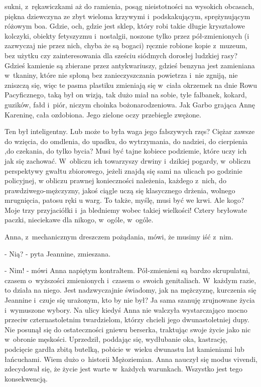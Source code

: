 \documentclass[oneside,polish,12pt,sfheadings]{mwbk}
\begin{document}
sukni, z~rękawiczkami aż do ramienia, posąg nieistotności na wysokich
obcasach, piękna dziewczyna ze zbyt wieloma krzywymi i~podskakującym,
sprężynującym różowym boa. Gdzie, och, gdzie jest sklep, który robi
takie długie kryształowe kolczyki, obiekty fetyszyzmu i~nostalgii,
noszone tylko przez pół-zmienionych (i zazwyczaj nie przez nich, chyba
że są bogaci) ręcznie robione kopie z~muzeum, bez użytku czy zainteresowania
dla sześciu siódmych dorosłej ludzkiej rasy? Gdzieś kamienie są zbierane
przez antykwariuszy, gdzieś benzyna jest zamieniana w~tkaniny, które
nie spłoną bez zanieczyszczania powietrza i~nie zgniją, nie zniszczą
się, więc te pasma plastiku zmieniają się w~ciała okrzemek na dnie
Rowu Pacyficznego, taką był on wizją, tak dużo miał na sobie, tyle
falbanek, kokard, guzików, fałd i~piór, niczym choinka bożonarodzeniowa.
Jak Garbo grająca Annę Kareninę, cała ozdobiona. Jego zielone oczy
przebiegle zwężone.

Ten był inteligentny. Lub może to była waga jego fałszywych rzęs?
Ciężar zawsze do wzięcia, do omdlenia, do upadku, do wytrzymania,
do nadziei, do cierpienia ,do czekania, do tylko bycia? Musi być tajne
kobiece podziemie, które uczy ich jak się zachować. W~obliczu ich
towarzyszy drwiny i~dzikiej pogardy, w~obliczu perspektywy gwałtu
zbiorowego, jeżeli znajdą się sami na ulicach po godzinie policyjnej,
w obliczu prawnej konieczności należenia, każdego z~nich, do prawdziwego-mężczyzny,
jakoś ciągle uczą się klasycznego drżenia, wolnego mrugnięcia, patosu
ręki u warg. To także, myślę, musi być we krwi. Ale kogo? Moje trzy
przyjaciółki i~ja bledniemy wobec takiej wielkości! Cztery bryłowate
paczki, nieciekawe dla nikogo, w~ogóle, w~ogóle.

Anna, z~mechanicznym dreszczem pożądania, mówi, że musimy iść z~nim.

- Nią? - pyta Jeannine, zmieszana.

- Nim! - mówi Anna napiętym kontraltem. Pół-zmienieni są bardzo skrupulatni,
czasem o~wyższości zmienionych i~czasem o~swoich genitaliach. W~każdym
razie, to działa na niego. Jest nadzwyczajnie świadomy, jak na mężczyznę,
kurczenia się Jeannine i~czuje się urażonym, kto by nie był? Ja sama
szanuję zrujnowane życia i~wymuszone wybory. Na ulicy kiedyś Anna
nie walczyła wystarczająco mocno przeciw czternastoletnim twardzielom,
którzy chcieli jego dwunastoletniej dupy. Nie posunął się do ostateczności
gniewu berserka, traktując swoje życie jako nic w~obronie męskości.
Uprzedził, poddając się, wydłubanie oka, kastrację, podcięcie gardła
zbitą butelką, pobicie w~wieku dwunastu lat kamieniami lub łańcuchami.
Wiem dużo o~historii Mężoziemian. Anna nauczył się modus vivendi,
zdecydował się, że życie jest warte w~każdych warunkach. Wszystko
jest tego konsekwencją.
\end{document}
